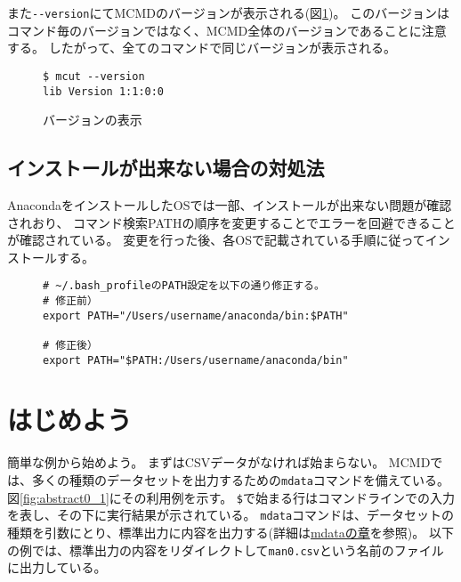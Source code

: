 また\verb|--version|にてMCMDのバージョンが表示される(図\ref{fig:abstract3_3})。
このバージョンはコマンド毎のバージョンではなく、MCMD全体のバージョンであることに注意する。
したがって、全てのコマンドで同じバージョンが表示される。

\begin{figure}[htbp]
\begin{Verbatim}[baselinestretch=0.7,frame=single]
$ mcut --version
lib Version 1:1:0:0
\end{Verbatim}
\caption{バージョンの表示\label{fig:abstract3_3}}
\end{figure}

\subsection{インストールが出来ない場合の対処法}
AnacondaをインストールしたOSでは一部、インストールが出来ない問題が確認されおり、
コマンド検索PATHの順序を変更することでエラーを回避できることが確認されている。
変更を行った後、各OSで記載されている手順に従ってインストールする。

\begin{figure}[htbp]
\begin{Verbatim}[baselinestretch=0.7,frame=single]
# ~/.bash_profileのPATH設定を以下の通り修正する。
# 修正前）
export PATH="/Users/username/anaconda/bin:$PATH"

# 修正後）
export PATH="$PATH:/Users/username/anaconda/bin"
\end{Verbatim}
\end{figure}

\section{はじめよう\label{sect:helloWorld}}
簡単な例から始めよう。
まずはCSVデータがなければ始まらない。
MCMDでは、多くの種類のデータセットを出力するための\verb|mdata|コマンドを備えている。
図\ref{fig:abstract0_1}にその利用例を示す。
\verb|$|で始まる行はコマンドラインでの入力を表し、その下に実行結果が示されている。
\verb|mdata|コマンドは、データセットの種類を引数にとり、標準出力に内容を出力する(詳細は\hyperref[sect:mdata]{mdataの章}を参照)。 
以下の例では、標準出力の内容をリダイレクトして\verb|man0.csv|という名前のファイルに出力している。


